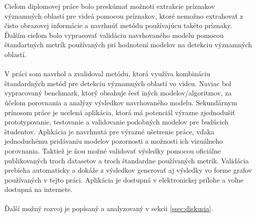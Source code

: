 Cieľom diplomovej práce bolo preskúmať možnoti extrakcie príznakov významných oblastí pre videá pomocou príznakov, ktoré nemožno extrahovať z čisto obrazovej informácie a navrhnúť metódu používajúcu takéto príznaky.
Ďalším cieľom bolo vypracovať validáciu navrhovaného modelu pomocou štandartných metrík používaných pri hodnotení modelov na detekciu významných oblastí.
\\
\\
V práci som navrhol a zvalidoval metódu, ktorá využíva kombináciu štandardných metód pre detekciu významných oblastí vo videu.
Naviac bol vypracovaný benchmark, ktorý obsahuje šesť iných modelov/algoritmov, za účelom porovnania a analýzy výsledkov navrhovaného modelu.
Sekundárnym prínosom práce je ucelená aplikácia, ktorá má potenciál výrazne zjednodušiť prototypovanie, testovanie a validovanie podobných modelov pre budúcich študentov.
Aplikácia je navrhnutá pre výrazné ušetrenie práce, vďaka jednoduchému pridávaniu modelov pozornosti a možnosti ich vizuálneho porovnania.
Taktiež je ňou možné validovať výsledky pomocou oficiálne publikovaných troch datasetov a troch štandardne používaných metrík.
Validácia prebieha automaticky a dokáže z výsledkov generovať aj výsledky vo forme grafov používaných v tejto práci.
Aplikácia je dostupná v elektronickej prílohe a voľne dostupná na internete.
\\
\\
Ďalší možný rozvoj je popísaný a analyzovaný v sekcii \ref{ssec:diskusia}.
